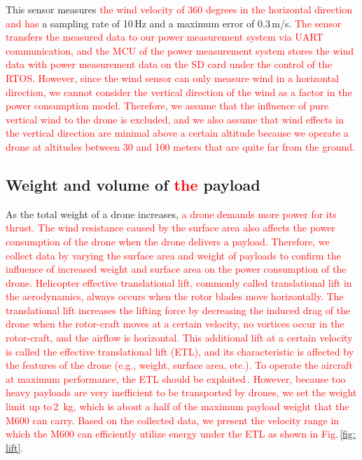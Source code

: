 \documentclass[journal]{./template/IEEEtran}
\begin{document}
\noindent This sensor measures \textcolor{red}{the wind velocity of 360 degrees in the horizontal direction and has} a sampling rate of 10\,Hz and a maximum error of 0.3\,m/s.
\textcolor{red}{The sensor transfers the measured data to our power measurement system via UART communication, and the MCU of the power measurement system stores the wind data with power measurement data on the SD card under the control of the RTOS.
However, since the wind sensor can only measure wind in a horizontal direction, we cannot consider the vertical direction of the wind as a factor in the power consumption model.
Therefore, we assume that the influence of pure vertical wind to the drone is excluded, and we also assume that wind effects in the vertical direction are minimal above a certain altitude because we operate a drone at altitudes between 30 and 100 meters that are quite far from the ground.}









\subsection{Weight and volume of \textcolor{red}{the} payload}
\label{sub_section:lift}
As the total weight of a drone increases, \textcolor{red}{a drone demands more power for its thrust.
The wind resistance caused by the surface area also affects the power consumption of the drone when the drone delivers a payload.
Therefore, we collect data by varying the surface area and weight of payloads to confirm the influence of increased weight and surface area on the power consumption of the drone.
Helicopter effective translational lift, commonly called translational lift in the aerodynamics, always occurs when the rotor blades move horizontally.
The translational lift increases the lifting force by decreasing the induced drag of the drone when the rotor-craft moves at a certain velocity, no vortices occur in the rotor-craft, and the airflow is horizontal.
This additional lift at a certain velocity is called the effective translational lift (ETL), and its characteristic is affected by the features of the drone (e.g., weight, surface area, etc.).
To operate the aircraft at maximum performance, the ETL should be exploited\,\cite{ref_20}.
However, because too heavy payloads are very inefficient to be transported by drones, we set the weight limit up to\,2~kg, which is about a half of the maximum payload weight that the M600 can carry.
Based on the collected data, we present the velocity range in which the M600 can efficiently utilize energy under the ETL as shown in Fig.\,\ref{fig: lift}. 
}
\end{document}
